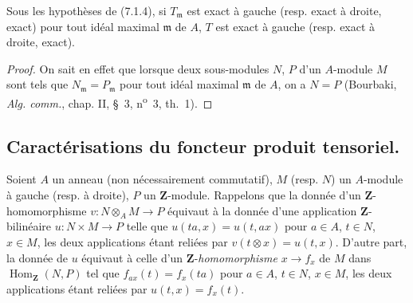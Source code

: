 \begin{proposition}[7.1.5]
Sous les hypothèses de (7.1.4), si $T_{\mathfrak m}$ est exact à gauche
\textup{(resp.} exact à droite, exact) pour tout idéal maximal $\mathfrak m$ de $A$,
$T$ est exact à gauche \textup{(resp.} exact à droite, exact).
\end{proposition}

\begin{proof}
On sait en effet que lorsque deux sous-modules $N$, $P$ d'un $A$-module $M$
sont tels que $N_{\mathfrak m}=P_{\mathfrak m}$ pour tout idéal maximal
$\mathfrak m$ de $A$, on a $N=P$ (Bourbaki, \emph{Alg. comm.}, chap. II,
\S~3, n\textsuperscript{o}~3, th.~1).
\end{proof}

\subsection{Caractérisations du foncteur produit tensoriel.}
\label{subsection:III.7.2.fr}

\begin{env}[7.2.1]
Soient $A$ un anneau (non nécessairement commutatif), $M$ (resp. $N$) un
$A$-module à gauche (resp. à droite), $P$ un $\mathbf Z$-module. Rappelons
que la donnée d'un $\mathbf Z$-homomorphisme $v:N\otimes_A M\longrightarrow P$
équivaut à la donnée d'une application $\mathbf Z$-bilinéaire $u:N\times M\longrightarrow P$
telle que $u(ta,x)=u(t,ax)$ pour $a\in A$, $t\in N$, $x\in M$,
les deux applications étant reliées par $v(t\otimes x)=u(t,x)$. D'autre part,
la donnée de $u$ équivaut à celle d'un
$\mathbf Z$-\emph{homomorphisme} $x\to f_x$ de $M$ dans
$\operatorname{Hom}_{\mathbf Z}(N,P)$ tel que
$f_{ax}(t)=f_x(ta)$ pour $a\in A$, $t\in N$, $x\in M$,
les deux applications étant reliées par $u(t,x)=f_x(t)$.
\end{env}

